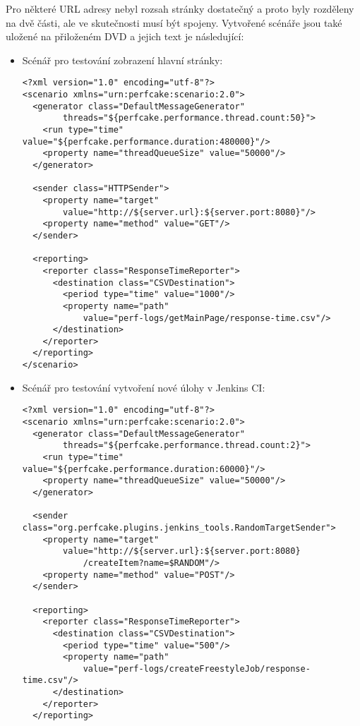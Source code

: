     \medskip

    Pro některé URL adresy nebyl rozsah stránky dostatečný a proto byly
    rozděleny na dvě části, ale ve skutečnosti musí být spojeny.
    Vytvořené scénáře jsou také uložené na přiloženém DVD a jejich text je následující:
       \begin{itemize}
        \item Scénář pro testování zobrazení hlavní stránky:
\begin{verbatim}
<?xml version="1.0" encoding="utf-8"?>
<scenario xmlns="urn:perfcake:scenario:2.0">
  <generator class="DefaultMessageGenerator" 
        threads="${perfcake.performance.thread.count:50}">
    <run type="time" value="${perfcake.performance.duration:480000}"/>
    <property name="threadQueueSize" value="50000"/>
  </generator>
  
  <sender class="HTTPSender">
    <property name="target" 
        value="http://${server.url}:${server.port:8080}"/>
    <property name="method" value="GET"/>                                                                                               
  </sender>
  
  <reporting>
    <reporter class="ResponseTimeReporter">
      <destination class="CSVDestination">
        <period type="time" value="1000"/>
        <property name="path" 
            value="perf-logs/getMainPage/response-time.csv"/>
      </destination>
    </reporter>
  </reporting>
</scenario>
\end{verbatim}

        \newpage
        \item Scénář pro testování vytvoření nové úlohy v Jenkins CI:
\begin{verbatim}
<?xml version="1.0" encoding="utf-8"?>
<scenario xmlns="urn:perfcake:scenario:2.0">
  <generator class="DefaultMessageGenerator" 
        threads="${perfcake.performance.thread.count:2}">
    <run type="time" value="${perfcake.performance.duration:60000}"/>                                                                         
    <property name="threadQueueSize" value="50000"/>                                                                                         
  </generator>
              
  <sender class="org.perfcake.plugins.jenkins_tools.RandomTargetSender">
    <property name="target" 
        value="http://${server.url}:${server.port:8080}
            /createItem?name=$RANDOM"/>
    <property name="method" value="POST"/>
  </sender>

  <reporting>
    <reporter class="ResponseTimeReporter">
      <destination class="CSVDestination">
        <period type="time" value="500"/>
        <property name="path" 
            value="perf-logs/createFreestyleJob/response-time.csv"/>
      </destination>
    </reporter>
  </reporting>
    

\end{verbatim}
\end{itemize}
